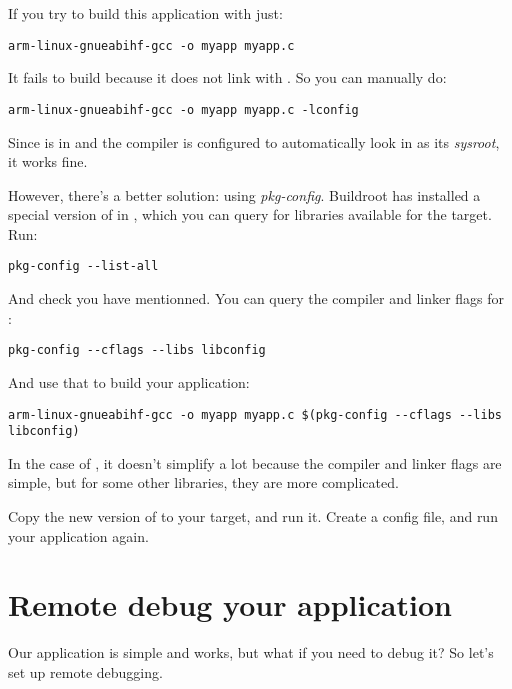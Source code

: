 If you try to build this application with just:

\begin{verbatim}
arm-linux-gnueabihf-gcc -o myapp myapp.c
\end{verbatim}

It fails to build because it does not link with . So
you can manually do:

\begin{verbatim}
arm-linux-gnueabihf-gcc -o myapp myapp.c -lconfig
\end{verbatim}

Since  is in  and the
compiler is configured to automatically look in 
as its {\em sysroot}, it works fine.

However, there's a better solution: using {\em pkg-config}. Buildroot
has installed a special version of  in
, which you can query for libraries
available for the target. Run:

\begin{verbatim}
pkg-config --list-all
\end{verbatim}

And check you have  mentionned. You can query the
compiler and linker flags for :

\begin{verbatim}
pkg-config --cflags --libs libconfig
\end{verbatim}

And use that to build your application:

\begin{verbatim}
arm-linux-gnueabihf-gcc -o myapp myapp.c $(pkg-config --cflags --libs libconfig)
\end{verbatim}

In the case of , it doesn't simplify a lot because the
compiler and linker flags are simple, but for some other libraries,
they are more complicated.

Copy the new version of  to your target, and run
it. Create a  config file, and run your application
again.

\section{Remote debug your application}

Our application is simple and works, but what if you need to debug it?
So let's set up remote debugging.

